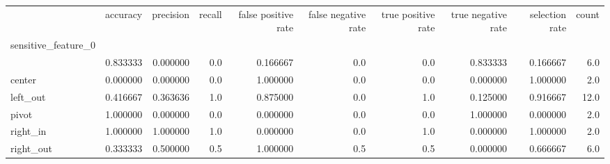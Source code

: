 \begin{tabular}{lrrrrrrrrr}
\toprule
{} &  accuracy &  precision &  recall &  false positive rate &  false negative rate &  true positive rate &  true negative rate &  selection rate &  count \\
sensitive\_feature\_0 &           &            &         &                      &                      &                     &                     &                 &        \\
\midrule
                    &  0.833333 &   0.000000 &     0.0 &             0.166667 &                  0.0 &                 0.0 &            0.833333 &        0.166667 &    6.0 \\
center              &  0.000000 &   0.000000 &     0.0 &             1.000000 &                  0.0 &                 0.0 &            0.000000 &        1.000000 &    2.0 \\
left\_out            &  0.416667 &   0.363636 &     1.0 &             0.875000 &                  0.0 &                 1.0 &            0.125000 &        0.916667 &   12.0 \\
pivot               &  1.000000 &   0.000000 &     0.0 &             0.000000 &                  0.0 &                 0.0 &            1.000000 &        0.000000 &    2.0 \\
right\_in            &  1.000000 &   1.000000 &     1.0 &             0.000000 &                  0.0 &                 1.0 &            0.000000 &        1.000000 &    2.0 \\
right\_out           &  0.333333 &   0.500000 &     0.5 &             1.000000 &                  0.5 &                 0.5 &            0.000000 &        0.666667 &    6.0 \\
\bottomrule
\end{tabular}
